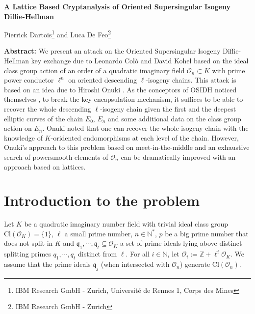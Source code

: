 \documentclass[a4paper,10pt]{article}
\theoremstyle{definition}
\theoremstyle{plain}
\theoremstyle{definition}
\newcommand{\N}{\mathbb{N}}
\newcommand{\Z}{\mathbb{Z}}
\newcommand{\mO}{\mathcal{O}}
\renewcommand{\(}{\left(}
\renewcommand{\)}{\right)}
\newcommand{\mf}[1]{\mathfrak{#1}}
\begin{document}
\begin{center}

{\LARGE {\bfseries A Lattice Based Cryptanalysis of Oriented Supersingular Isogeny Diffie-Hellman}}

\vspace{1cm}

{\Large Pierrick Dartois\footnote{IBM Research GmbH - Zurich, Universit\'{e} de Rennes 1, Corps des Mines} and Luca De Feo\footnote{IBM Research GmbH - Zurich}}

\vspace{1cm}

\end{center}

\textbf{Abstract:} We present an attack on the Oriented Supersingular Isogeny Diffie-Hellman key exchange due to Leonardo Col\`{o} and David Kohel  \cite{OSIDH} based on the ideal class group action of an order of a quadratic imaginary field $\mO_n\subset K$ with prime power conductor $\ell^n$ on oriented descending $\ell$-isogeny chains. This attack is based on an idea due to Hiroshi Onuki \cite{Onuki}.  As the conceptors of OSIDH noticed themselves \cite[§ 5.3]{OSIDH}, to break the key encapsulation mechanism, it suffices to be able to recover the whole descending $\ell$-isogeny chain given the first and the deepest elliptic curves of the chain $E_0$, $E_n$ and some additional data on the class group action on $E_n$. Onuki noted that one can recover the whole isogeny chain with the knowledge of $K$-oridented endomorphisms at each level of the chain.  However, Onuki's approach to this problem based on meet-in-the-middle and an exhaustive search of powersmooth elements of $\mO_n$ can be dramatically improved with an approach based on lattices.

\section{Introduction to the problem}

Let $K$ be a quadratic imaginary number field with trivial ideal class group $\mbox{Cl}(\mO_K)=\{1\}$, $\ell$ a small prime number, $n\in\N^*$, $p$ be a big prime number that does not split in $K$ and $\mf{q}_1, \cdots, \mf{q}_t\subseteq \mO_K$ a set of prime ideals lying above distinct splitting primes $q_1, \cdots, q_t$ distinct from $\ell$. For all $i\in\N$, let $\mO_i:=\Z+\ell^i\mO_K$. We assume that the prime ideals $\mf{q}_j$ (when intersected with $\mO_n$) generate $\mbox{Cl}(\mO_n)$. 
\end{document}
